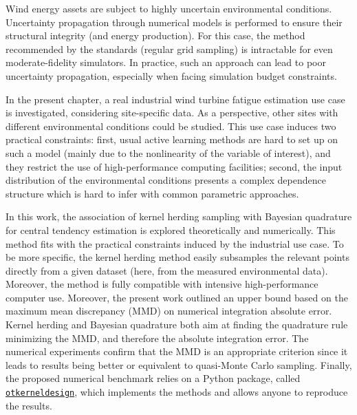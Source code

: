 Wind energy assets are subject to highly uncertain environmental conditions. 
Uncertainty propagation through numerical models is performed to ensure their structural integrity (and energy production). 
For this case, the method recommended by the standards (regular grid sampling) is intractable for even moderate-fidelity simulators. 
In practice, such an approach can lead to poor uncertainty propagation, especially when facing simulation budget constraints.

In the present chapter, a real industrial wind turbine fatigue estimation use case is investigated, considering site-specific data. 
As a perspective, other sites with different environmental conditions could be studied. 
This use case induces two practical constraints: first, usual active learning methods are hard to set up on such a model (mainly due to the nonlinearity of the variable of interest), and they restrict the use of high-performance computing facilities; second, the input distribution of the environmental conditions presents a complex dependence structure which is hard to infer with common parametric approaches. 

In this work, the association of kernel herding sampling with Bayesian quadrature for central tendency estimation is explored theoretically and numerically. 
This method fits with the practical constraints induced by the industrial use case. 
To be more specific, the kernel herding method easily subsamples the relevant points directly from a given dataset (here, from the measured environmental data). 
Moreover, the method is fully compatible with intensive high-performance computer use. 
Moreover, the present work outlined an upper bound based on the maximum mean discrepancy (MMD) on numerical integration absolute error. 
Kernel herding and Bayesian quadrature both aim at finding the quadrature rule minimizing the MMD, and therefore the absolute integration error. 
The numerical experiments confirm that the MMD is an appropriate criterion since it leads to results being better or equivalent to quasi-Monte Carlo sampling. 
Finally, the proposed numerical benchmark relies on a Python package, called \texttt{\href{https://efekhari27.github.io/otkerneldesign/master/index.html}{otkerneldesign}}, which implements the methods and allows anyone to reproduce the results. 

